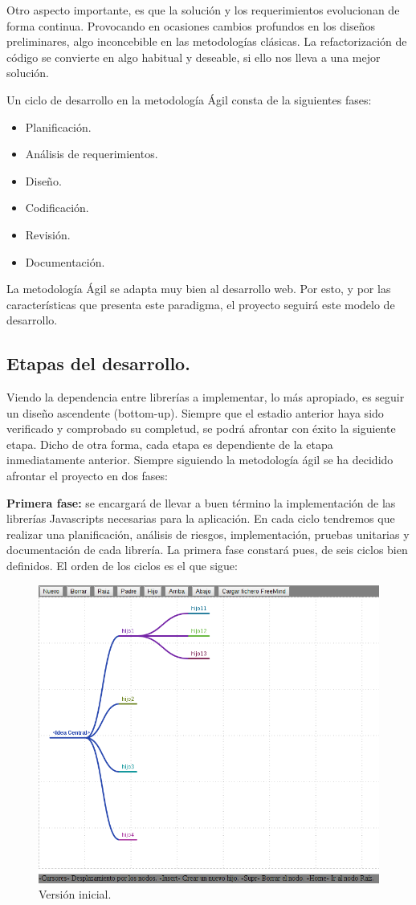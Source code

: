 Otro aspecto importante, es que la solución y los requerimientos evolucionan de forma continua. Provocando en ocasiones cambios profundos en los diseños preliminares, algo inconcebible en las metodologías clásicas. La refactorización de código se convierte en algo habitual y deseable, si ello nos lleva a una mejor solución.

Un ciclo de desarrollo en la metodología Ágil consta de la siguientes fases:

\begin{itemize}
\item Planificación.
\item Análisis de requerimientos.
\item Diseño.
\item Codificación.
\item Revisión.
\item Documentación.
\end{itemize}

La metodología Ágil se adapta muy bien al desarrollo web. Por esto, y por las características que presenta este paradigma, el proyecto seguirá este modelo de desarrollo.

\subsection{Etapas del desarrollo.}

Viendo la dependencia entre librerías a implementar, lo más apropiado, es seguir un diseño ascendente (bottom-up). Siempre que el estadio anterior haya sido verificado y comprobado su completud, se podrá afrontar con éxito la siguiente etapa. Dicho de otra forma, cada etapa es dependiente de la etapa inmediatamente anterior. Siempre siguiendo la metodología ágil se ha decidido afrontar el proyecto en dos fases:

\textbf{Primera fase:} se encargará de llevar a buen término la implementación de las librerías Javascripts necesarias para la aplicación. En cada ciclo tendremos que realizar una planificación, análisis de riesgos, implementación, pruebas unitarias y documentación de cada librería. La primera fase constará pues, de seis ciclos bien definidos. El orden de los ciclos es el que sigue:

\begin{figure}[tbph]
\centering
\includegraphics[width=0.5\linewidth]{imagenes/primeraVersion1}
\caption{Versión inicial.}
\label{fig:versioninicial1}
\end{figure}


